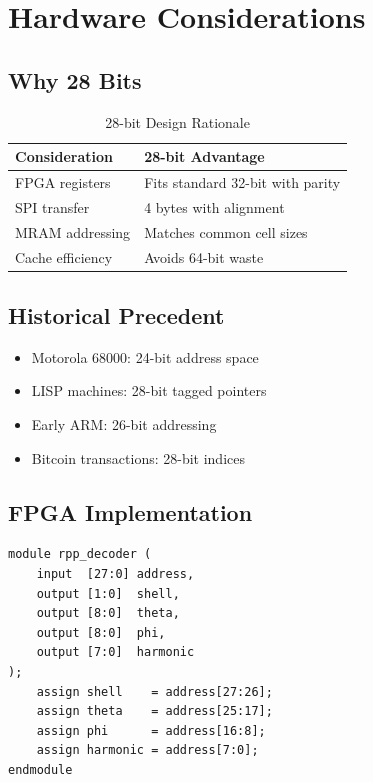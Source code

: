 \documentclass[11pt,a4paper]{article}
\begin{document}
\section{Hardware Considerations}

\subsection{Why 28 Bits}

\begin{table}[h]
\centering
\begin{tabular}{ll}
\toprule
\textbf{Consideration} & \textbf{28-bit Advantage} \\
\midrule
FPGA registers & Fits standard 32-bit with parity \\
SPI transfer & 4 bytes with alignment \\
MRAM addressing & Matches common cell sizes \\
Cache efficiency & Avoids 64-bit waste \\
\bottomrule
\end{tabular}
\caption{28-bit Design Rationale}
\end{table}

\subsection{Historical Precedent}

\begin{itemize}
    \item Motorola 68000: 24-bit address space
    \item LISP machines: 28-bit tagged pointers
    \item Early ARM: 26-bit addressing
    \item Bitcoin transactions: 28-bit indices
\end{itemize}

\subsection{FPGA Implementation}

\begin{lstlisting}[style=verilog,caption={Verilog RPP Decoder}]
module rpp_decoder (
    input  [27:0] address,
    output [1:0]  shell,
    output [8:0]  theta,
    output [8:0]  phi,
    output [7:0]  harmonic
);
    assign shell    = address[27:26];
    assign theta    = address[25:17];
    assign phi      = address[16:8];
    assign harmonic = address[7:0];
endmodule
\end{lstlisting}
\end{document}
